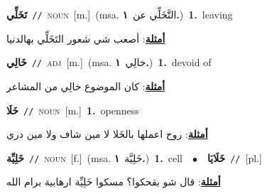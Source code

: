 \documentclass[10pt,a4paper,twoside]{article} %
\begin{document}
\begin{multicols}{2}
{\setlength\topsep{0pt}\textbf{\foreignlanguage{arabic}{تَخَلِّي}}\ {\color{gray}\texttt{//}\color{black}}\ \textsc{noun}\ [m.]\ \color{gray}(msa. \foreignlanguage{arabic}{التَّخَلِّي عن}~\foreignlanguage{arabic}{\textbf{١.}})\color{black}\ \textbf{1.}~leaving\  \begin{flushright}\color{gray}\foreignlanguage{arabic}{\textbf{\underline{\foreignlanguage{arabic}{أمثلة}}}: أصعب شي شعور التَخَلِّي بهالدنيا}\end{flushright}\color{black}} \vspace{2mm}

{\setlength\topsep{0pt}\textbf{\foreignlanguage{arabic}{خَالِي}}\ {\color{gray}\texttt{//}\color{black}}\ \textsc{adj}\ [m.]\ \color{gray}(msa. \foreignlanguage{arabic}{خالِي}~\foreignlanguage{arabic}{\textbf{١.}})\color{black}\ \textbf{1.}~devoid of\  \begin{flushright}\color{gray}\foreignlanguage{arabic}{\textbf{\underline{\foreignlanguage{arabic}{أمثلة}}}: كان الموضوع خالِي من المشاعر}\end{flushright}\color{black}} \vspace{2mm}

{\setlength\topsep{0pt}\textbf{\foreignlanguage{arabic}{خَلَا}}\ {\color{gray}\texttt{//}\color{black}}\ \textsc{noun}\ [m.]\ \textbf{1.}~openness\  \begin{flushright}\color{gray}\foreignlanguage{arabic}{\textbf{\underline{\foreignlanguage{arabic}{أمثلة}}}: روح اعملها بالخَلا لا مين شاف ولا مين دري}\end{flushright}\color{black}} \vspace{2mm}

{\setlength\topsep{0pt}\textbf{\foreignlanguage{arabic}{خَلِيِّة}}\ {\color{gray}\texttt{//}\color{black}}\ \textsc{noun}\ [f.]\ \color{gray}(msa. \foreignlanguage{arabic}{خَلِيَّة}~\foreignlanguage{arabic}{\textbf{١.}})\color{black}\ \textbf{1.}~cell\ \ $\bullet$\ \ \setlength\topsep{0pt}\textbf{\foreignlanguage{arabic}{خَلَايَا}}\ {\color{gray}\texttt{//}\color{black}}\ [pl.]\  \begin{flushright}\color{gray}\foreignlanguage{arabic}{\textbf{\underline{\foreignlanguage{arabic}{أمثلة}}}: قال شو بقحكوا؟ مسكوا خَلِيِّة ارهابية برام الله}\end{flushright}\color{black}} \vspace{2mm}


\end{multicols}
\end{document}
